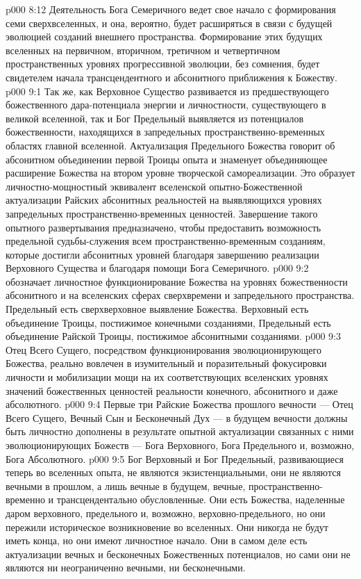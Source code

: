 \vs p000 8:12 Деятельность Бога Семеричного ведет свое начало с формирования семи сверхвселенных, и она, вероятно, будет расширяться в связи с будущей эволюцией созданий внешнего пространства. Формирование этих будущих вселенных на первичном, вторичном, третичном и четвертичном пространственных уровнях прогрессивной эволюции, без сомнения, будет свидетелем начала трансцендентного и абсонитного приближения к Божеству.
\vs p000 9:1 Так же, как Верховное Существо развивается из предшествующего божественного дара\hyp{}потенциала энергии и личностности, существующего в великой вселенной, так и Бог Предельный выявляется из потенциалов божественности, находящихся в запредельных пространственно\hyp{}временных областях главной вселенной. Актуализация Предельного Божества говорит об абсонитном объединении первой Троицы опыта и знаменует объединяющее расширение Божества на втором уровне творческой самореализации. Это образует личностно\hyp{}мощностный эквивалент вселенской опытно\hyp{}Божественной актуализации Райских абсонитных реальностей на выявляющихся уровнях запредельных пространственно\hyp{}временных ценностей. Завершение такого опытного развертывания предназначено, чтобы предоставить возможность предельной судьбы\hyp{}служения всем пространственно\hyp{}временным созданиям, которые достигли абсонитных уровней благодаря завершению реализации Верховного Существа и благодаря помощи Бога Семеричного.
\vs p000 9:2 \pc {} обозначает личностное функционирование Божества на уровнях божественности абсонитного и на вселенских сферах сверхвремени и запредельного пространства. Предельный есть сверхверховное выявление Божества. Верховный есть объединение Троицы, постижимое конечными созданиями, Предельный есть объединение Райской Троицы, постижимое абсонитными созданиями.
\vs p000 9:3 Отец Всего Сущего, посредством функционирования эволюционирующего Божества, реально вовлечен в изумительный и поразительный  фокусировки личности и мобилизации мощи на их соответствующих вселенских уровнях значений божественных ценностей реальности конечного, абсонитного и даже абсолютного.
\vs p000 9:4 Первые три Райские Божества прошлого вечности --- Отец Всего Сущего, Вечный Сын и Бесконечный Дух --- в будущем вечности должны быть личностно дополнены в результате опытной актуализации связанных с ними эволюционирующих Божеств --- Бога Верховного, Бога Предельного и, возможно, Бога Абсолютного.
\vs p000 9:5 \pc Бог Верховный и Бог Предельный, развивающиеся теперь во вселенных опыта, не являются экзистенциальными, они не являются вечными в прошлом, а лишь вечные в будущем, вечные, пространственно\hyp{}временно и трансцендентально обусловленные. Они есть Божества, наделенные даром верховного, предельного и, возможно, верховно\hyp{}предельного, но они пережили историческое возникновение во вселенных. Они никогда не будут иметь конца, но они имеют личностное начало. Они в самом деле есть актуализации вечных и бесконечных Божественных потенциалов, но сами они не являются ни неограниченно вечными, ни бесконечными.
